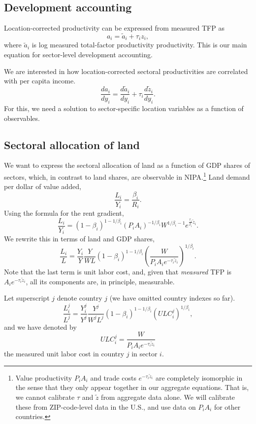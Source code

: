 \documentclass[12pt]{article}
\begin{document}
\subsection{Development accounting} 
Location-corrected productivity can be expressed from measured TFP as
\[
a_i =  \tilde a_i+ \tau_{i}z_{i},
\]
where $\tilde a_i$ is log measured total-factor productivity productivity. This is our main equation for sector-level development accounting.

We are interested in how location-corrected sectoral productivities are correlated with per capita income.
\[
\frac{d a_i}{dy_i} = \frac{d \tilde a_i}{dy_i}+ \tau_{i}\frac{d \tilde z_i}{dy_i}.
\]
For this, we need a solution to sector-specific location variables as a function of observables.  

\subsection{Sectoral allocation of land}
We want to express the sectoral allocation of land as a function of GDP shares of sectors,  which, in contrast to land shares, are observable in NIPA.\footnote{Value productivity $P_iA_i$ and trade costs $e^{-\tau_i \tilde z_i}$ are completely isomorphic in the sense that they only appear together in our aggregate equations. That is, we cannot calibrate $\tau$ and $\tilde z$ from aggregate data alone. We will calibrate these from ZIP-code-level data in the U.S., and use data on $P_iA_i$ for other countries.} Land demand per dollar of value added,
\[
\frac{L_i}{Y_i} =
\frac{\beta_i}{R_i}.
\]
Using the formula for the rent gradient, 
\[
\frac{L_i}{Y_i} =
(1-\beta_i)^{1-1/\beta_i} (P_iA_i)^{-1/\beta_i}W^{1/\beta_i-1} e^{\frac{\tau_i}{\beta_i} \tilde z_i}.
\]
We rewrite this in terms of land and GDP shares,
\[
\frac{L_i}{L} = \frac{Y_i}{Y}\frac{Y}{WL}
(1-\beta_i)^{1-1/\beta_i}\left(\frac{W}{P_iA_i e^{-\tau_i\tilde z_i}}\right)^{1/\beta_i}.
\]
Note that the last term is unit labor cost, and, given that \emph{measured} TFP is $A_i e^{-\tau_i\tilde z_i}$, all its components are, in principle, measurable.

Let superscript $j$ denote country $j$ (we have omitted country indexes so far).
\begin{equation}
\label{eq:LandShare}
\frac{L_i^j}{L^j} = \frac{Y_i^j}{Y^j}\frac{Y^j}{W^jL^j}
(1-\beta_i)^{1-1/\beta_i}\left(ULC_i^j\right)^{1/\beta_i} ,
\end{equation}
and we have denoted by
\[
ULC_i^j
=
\frac{W}{P_iA_i e^{-\tau_i\tilde z_i}}
\]
the measured unit labor cost in country $j$ in sector $i$.
\end{document}
